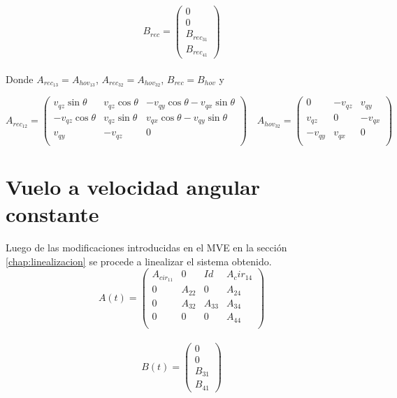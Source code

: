 \begin{equation}
\label{eq:Brec}
B_{rec}=\left(\begin{array}{c}
0\\
0\\
B_{rec_{31}}\\
B_{rec_{41}} 
\end{array}\right)
\end{equation}\\

Donde $A_{rec_{13}}=A_{hov_{13}}$, $A_{rec_{32}}=A_{hov_{32}}$,    $B_{rec}=B_{hov}$ y 

\begin{equation}
A_{rec_{12}}=\left(\begin{array}{ccc}
v_{qz}\sin\theta & v_{qz}\cos\theta & -v_{qy}\cos\theta-v_{qx}\sin\theta \\
-v_{qz}\cos\theta & v_{qz}\sin\theta & v_{qx}\cos\theta-v_{qy}\sin\theta \\
v_{qy} & -v_{qz} &0\\
\end{array}\right) \quad 
A_{hov_{32}}=\left(\begin{array}{ccc}
0 & -v_{qz} & v_{qy} \\
v_{qz} & 0 & -v_{qx}\\
-v_{qy} & v_{qx} &0\\
\end{array}\right)
\end{equation}

\section{Vuelo a velocidad angular constante}
Luego de las modificaciones introducidas en el MVE en la secci\'on \ref{chap:linealizacion} se procede a linealizar el sistema obtenido.
\begin{equation}
A(t)=\left(\begin{array}{cccc}
A_{cir_{11}} & 0 & Id & A{_cir_{14}}  \\
0 & A_{22} & 0      & A_{24}\\
0 & A_{32} & A_{33} & A_{34}\\
0 & 0      & 0      & A_{44} \\    
\end{array}\right)
\end{equation}\\


\begin{equation}
B(t)=\left(\begin{array}{c}
0\\
0\\
B_{31}\\
B_{41} 
\end{array}\right)
\end{equation}\\

